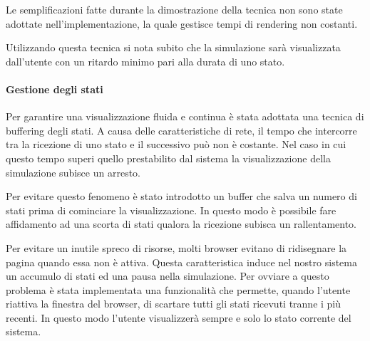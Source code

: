 Le semplificazioni fatte durante la dimostrazione della tecnica non sono state
adottate nell'implementazione, la quale gestisce tempi di rendering non
costanti.

Utilizzando questa tecnica si nota subito che la simulazione sarà visualizzata
dall'utente con un ritardo minimo pari alla durata di uno stato.

\paragraph*{Gestione degli stati}
Per garantire una visualizzazione fluida e continua è stata adottata una tecnica
di buffering degli stati. A causa delle caratteristiche di rete, il tempo che
intercorre tra la ricezione di uno stato e il successivo può non è costante. Nel
caso in cui questo tempo superi quello prestabilito dal sistema la
visualizzazione della simulazione subisce un arresto.

Per evitare questo fenomeno è stato introdotto un buffer che salva un numero di
stati prima di cominciare la visualizzazione. In questo modo è possibile fare
affidamento ad una scorta di stati qualora la ricezione subisca un
rallentamento.

Per evitare un inutile spreco di risorse, molti browser evitano di ridisegnare
la pagina quando essa non è attiva. Questa caratteristica induce nel nostro
sistema un accumulo di stati ed una pausa nella simulazione. Per ovviare a
questo problema è stata implementata una funzionalità che permette, quando
l'utente riattiva la finestra del browser, di scartare tutti gli stati ricevuti
tranne i più recenti. In questo modo l'utente visualizzerà sempre e solo lo
stato corrente del sistema.
